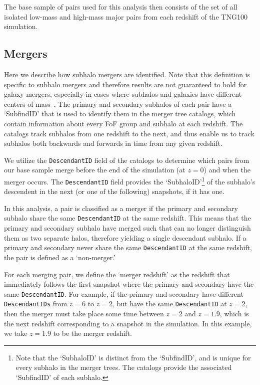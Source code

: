 \documentclass[twocolumn,linenumbers]{aastex631}
\begin{document}
The base sample of pairs used for this analysis then consists of the set of all
isolated 
low-mass and high-mass major pairs from each redshift of the TNG100 simulation. 

\subsection{Mergers} \label{subsec:mergers}
Here we describe how subhalo mergers are identified. 
Note that this definition is specific to subhalo mergers and therefore results are not guaranteed to hold for galaxy mergers, especially in cases where subhalos and galaxies have different centers of mass~\citep[see e.g.,]{RG2015}. %
The primary and secondary subhalos of each pair have a `SubfindID' that is used to identify them in the \subfind{} merger tree catalogs, which contain information about every FoF group and subhalo at each redshift. 
The \sublink{} catalogs track subhalos from one redshift to the next, and thus enable us to track subhalos both backwards and forwards in time from any given redshift. 

We utilize the \texttt{DescendantID} field of the \sublink{} catalogs to determine which pairs from our base sample merge before the end of the simulation (at $z=0$) and when the merger occurs. 
The \texttt{DescendantID} field provides the `SubhaloID'\footnote{Note that the `SubhaloID' is distinct from the `SubfindID', and is unique for every subhalo in the merger trees. 
The \sublink{} catalogs provide the associated `SubfindID' of each subhalo.} of the subhalo's descendent in the next (or one of the following) snapshots, if it has one. 

In this analysis, a pair is classified as a merger if the primary and secondary subhalo share the same \texttt{DescendantID} at the same redshift. 
This means that the primary and secondary subhalo have merged such that \subfind{} can no longer distinguish them as two separate halos, therefore yielding a single descendant subhalo.
If a primary and secondary never share the same \texttt{DescendantID} at the same redshift, the pair is defined as a `non-merger.'

For each merging pair, we define the `merger redshift' as the redshift that immediately follows the first snapshot where the primary and secondary have the same \texttt{DescendantID}. 
For example, if the primary and secondary have different \texttt{DescendantIDs} from $z=6$ to $z=2$, but have the same \texttt{DescendantID} at $z=2$, then the merger must take place some time between $z=2$ and $z=1.9$, which is the next redshift corresponding to a snapshot in the simulation. 
In this example, we take $z=1.9$ to be the merger redshift. 
\end{document}
